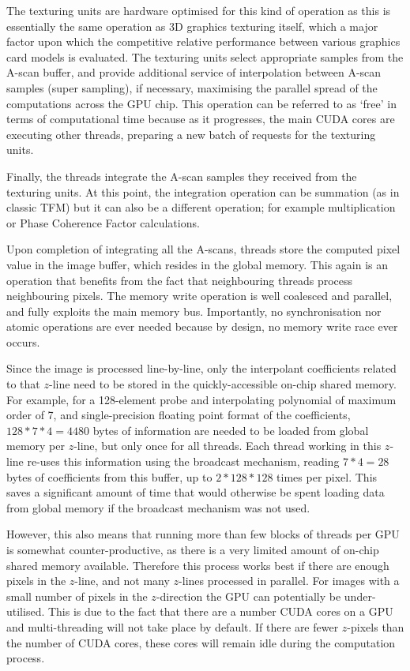 The texturing units are hardware optimised for this kind of operation as this is essentially the same operation as 3D graphics texturing itself, which a major factor upon which the competitive relative performance between various graphics card models is evaluated. The texturing units select appropriate samples from the A-scan buffer, and provide additional service of interpolation between A-scan samples (super sampling), if necessary, maximising the parallel spread of the computations across the GPU chip. This operation can be referred to as `free' in terms of computational time because as it progresses, the main CUDA cores are executing other threads, preparing a new batch of requests for the texturing units. 

Finally, the threads integrate the A-scan samples they received from the texturing units. At this point, the integration operation can be summation (as in classic TFM) but it can also be a different operation; for example multiplication\cite{lines_rapid_2006} or Phase Coherence Factor calculations\cite{camacho_phase_2009}.

Upon completion of integrating all the A-scans, threads store the computed pixel value in the image buffer, which resides in the global memory. This again is an operation that benefits from the fact that neighbouring threads process neighbouring pixels. The memory write operation is well coalesced and parallel, and fully exploits the main memory bus. Importantly, no synchronisation nor atomic operations are ever needed because by design, no memory write race ever occurs.

Since the image is processed line-by-line, only the interpolant coefficients related to that $z$-line need to be stored in the quickly-accessible on-chip shared memory. For example, for a 128-element probe and interpolating polynomial of maximum order of 7, and single-precision floating point format of the coefficients, $128*7*4 = 4480$ bytes of information are needed to be loaded from global memory per $z$-line, but only once for all threads. Each thread working in this $z$-line re-uses this information using the broadcast mechanism, reading $7*4=28$ bytes of coefficients from this buffer, up to $2*128*128$ times per pixel. This saves a significant amount of time that would otherwise be spent loading data from global memory if the broadcast mechanism was not used\cite{lee_cuda_2012}. 

However, this also means that running more than few blocks of threads per GPU is somewhat counter-productive, as there is a very limited amount of on-chip shared memory available. Therefore this process works best if there are enough pixels in the $z$-line, and not many $z$-lines processed in parallel. For images with a small number of pixels in the $z$-direction the GPU can potentially be under-utilised. This is due to the fact that there are a number CUDA cores on a GPU and multi-threading will not take place by default. If there are fewer $z$-pixels than the number of CUDA cores, these cores will remain idle during the computation process. 

